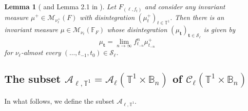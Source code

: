 \documentclass[11pt,reqno]{amsart}
\theoremstyle{plain}
\newtheorem{lemma}[theorem]{Lemma}
\newtheorem*{theorem A}{Theorem A}
\newtheorem*{theorem B}{Theorem B}
\newtheorem*{theorem C}{Theorem C}
\newtheorem*{theorem 1}{Theorem 1}
\newtheorem*{theorem 2}{Theorem 2}
\newtheorem*{theorem 3}{Theorem 3}
\numberwithin{equation}{section}
\begin{document}
\begin{lemma}[\cite{crauel1990extremal} and Lemma 2.1 in \cite{homburg2012circle}] \label{L1.1}
Let $F_{(\ell, f_t)}$ and consider any invariant measure $\mu^+ \in \mathcal{M}_{\nu_\ell^+}(F)$ with disintegration $(\mu^+_{{t}})_{t\in \mathbb{T}^1}$.
Then there is an invariant measure $\mu \in \mathcal{M}_{\nu_\ell}(\mathbb{F}_{F})$ whose disintegration $(\mu_{\textbf{t}})_{\textbf{t} \in \mathcal{S}_\ell}$ is given by
\begin{equation*}
  \mu_\textbf{t}=\lim_{n \to \infty}f^n_{t_{-n}}\mu^+_{t_{-n}}
\end{equation*}
for $\nu_\ell$-almost every $(\ldots,t_{-1},t_{0})\in \mathcal{S}_\ell$.
\end{lemma}

\subsection{The subset $\mathcal{A}_{\ell,\mathbb{T}^1} = \mathcal{A}_\ell (\mathbb{T}^1 \times \mathbb{B}_n)$ of $\mathcal{C}_\ell(\mathbb{T}^1 \times \mathbb{B}_n)$}

In what follows, we define the subset $\mathcal{A}_{\ell, \mathbb{T}^1} $.
\end{document}
